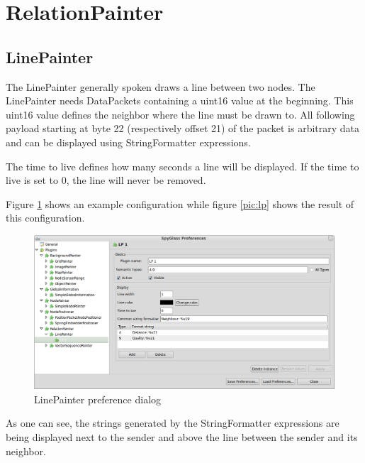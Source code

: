 \section{RelationPainter}

\subsection{LinePainter}

The LinePainter generally spoken draws a line between two nodes. The LinePainter needs DataPackets containing a uint16 value
at the beginning. This uint16 value defines the neighbor where the line must be drawn to. All following payload starting
at byte 22 (respectively offset 21) of the packet is arbitrary data and can be displayed using
StringFormatter expressions.

The time to live defines how many seconds a line will be displayed. If the time to live is set to 0, the line will
never be removed.

Figure \ref{pic:lp_preferences} shows an example configuration while figure \ref{pic:lp} shows the result of this
configuration.

\begin{figure}[htb]
  \begin{center}
    \includegraphics[width=13.2cm]{./pics/linepainter_prefpage}
    \caption{LinePainter preference dialog}
    \label{pic:lp_preferences}
  \end{center}
\end{figure}

As one can see, the strings generated by the StringFormatter expressions are being displayed next to the
sender and above the line between the sender and its neighbor.

